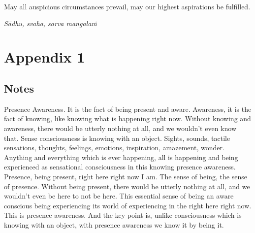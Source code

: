 \documentclass[12pt,openany]{book}
\begin{document}
May all auspicious circumstances prevail, may our highest aspirations be fulfilled. 

\textit{Sādhu, svaha, sarva mangalaṁ}

\medskip

\begin{figure}[h]
    \centering
\end{figure}

\chapter*{Appendix 1}
\section*{\centering Notes}

Presence Awareness. It is the fact of being present and aware. Awareness, it is the fact of knowing, like knowing what is happening right now. Without knowing and awareness, there would be utterly nothing at all, and we wouldn't even know that. Sense consciousness is knowing with an object. Sights, sounds, tactile sensations, thoughts, feelings, emotions, inspiration, amazement, wonder. Anything and everything which is ever happening, all is happening and being experienced as sensational consciousness in this knowing presence awareness. Presence, being present, right here right now I am. The sense of being, the sense of presence. Without being present, there would be utterly nothing at all, and we wouldn't even be here to not be here. This essential sense of being an aware conscious being experiencing its world of experiencing in the right here right now. This is presence awareness. And the key point is, unlike consciousness which is knowing with an object, with presence awareness we know it by being it.
\end{document}
